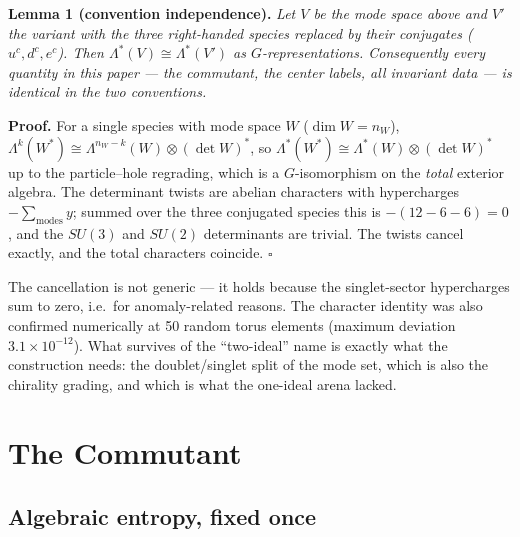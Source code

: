 \documentclass[11pt]{article}
\begin{document}
\medskip

\noindent\textbf{Lemma 1 (convention independence).} \emph{Let $V$ be the mode space above and $V'$ the variant with the three right-handed species replaced by their conjugates ($u^c, d^c, e^c$). Then $\Lambda^*(V)\cong\Lambda^*(V')$ as $G$-representations. Consequently every quantity in this paper --- the commutant, the center labels, all invariant data --- is identical in the two conventions.}

\medskip

\noindent\textbf{Proof.} For a single species with mode space $W$ ($\dim W = n_W$), $\Lambda^k(W^*) \cong \Lambda^{n_W-k}(W)\otimes(\det W)^{*}$, so $\Lambda^*(W^*) \cong \Lambda^*(W) \otimes (\det W)^*$ up to the particle--hole regrading, which is a $G$-isomorphism on the \emph{total} exterior algebra. The determinant twists are abelian characters with hypercharges $-\sum_{\mathrm{modes}} y$; summed over the three conjugated species this is $-(12-6-6) = 0$, and the $SU(3)$ and $SU(2)$ determinants are trivial. The twists cancel exactly, and the total characters coincide. \hfill$\square$

\medskip

The cancellation is not generic --- it holds because the singlet-sector hypercharges sum to zero, i.e.\ for anomaly-related reasons. The character identity was also confirmed numerically at 50 random torus elements (maximum deviation $3.1\times10^{-12}$). What survives of the ``two-ideal'' name is exactly what the construction needs: the doublet/singlet split of the mode set, which is also the chirality grading, and which is what the one-ideal arena lacked.

\section{The Commutant}\label{sec:commutant}

\subsection{Algebraic entropy, fixed once}
\end{document}
